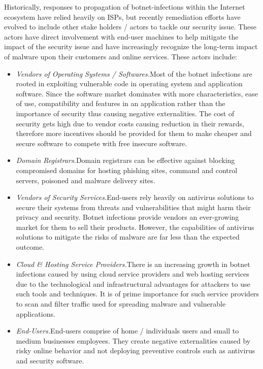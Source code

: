Historically, responses to propagation of botnet-infections within the Internet ecosystem have relied heavily on ISPs, but recently remediation efforts have evolved to include other stake holders / actors to tackle our security issue. These actors have direct involvement with end-user machines to help mitigate the impact of the security issue and have increasingly recognize the long-term impact of malware upon their customers and online services. These actors include:

\begin{itemize}
\item \textit{Vendors of Operating Systems / Softwares.}Most of the botnet infections are rooted in exploiting vulnerable code in operating system and application software. Since the software market dominates with more characteristics, ease of use, compatibility and features in an application rather than the importance of security thus causing negative externalities. The cost of security gets high due to vendor costs causing reduction in their rewards, therefore more incentives should be provided for them to make cheaper and secure software to compete with free insecure software.
\item \textit{Domain Registrars.}Domain registrars can be effective against blocking compromised domains for hosting phishing sites, command and control servers, poisoned and malware delivery sites.
\item \textit{Vendors of Security Services.}End-users rely heavily on antivirus solutions to secure their systems from threats and vulnerabilities that might harm their privacy and security. Botnet infections provide vendors an ever-growing market for them to sell their products. However, the capabilities of antivirus solutions to mitigate the risks of malware are far less than the expected outcome.
\item \textit{Cloud \& Hosting Service Providers.}There is an increasing growth in botnet infections caused by using cloud service providers and web hosting services due to the technological and infrastructural advantages for attackers to use such tools and techniques. It is of prime importance for such service providers to scan and filter traffic used for spreading malware and vulnerable applications.
\item \textit{End-Users.}End-users comprise of home / individuals users and small to medium businesses employees. They create negative externalities caused by risky online behavior and not deploying preventive controls such as antivirus and security software.
\end{itemize}

